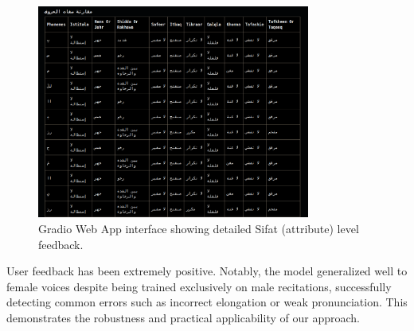 \begin{figure}[H]
\centering
\includegraphics[width=0.8\textwidth]{../figures/gradio_ui_sifa.png}
\caption{Gradio Web App interface showing detailed Sifat (attribute) level feedback.}
\label{fig:gradio_sifa}
\end{figure}

User feedback has been extremely positive. Notably, the model generalized well to female voices despite being trained exclusively on male recitations, successfully detecting common errors such as incorrect  elongation or weak  pronunciation. This demonstrates the robustness and practical applicability of our approach.
